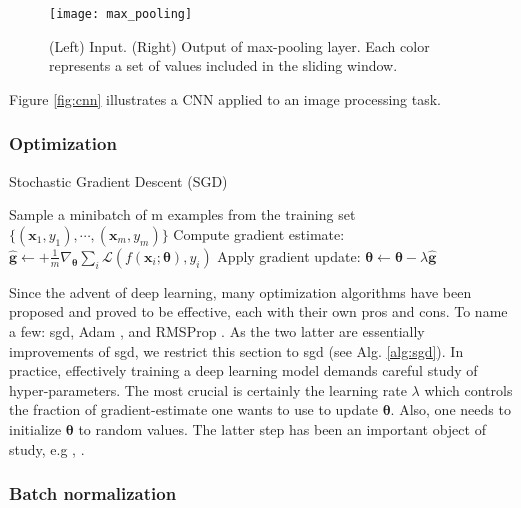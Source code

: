 \begin{figure}[!htpb]
  \centering
  \texttt{[image: max\_pooling]}
  \caption{(Left) Input. (Right) Output of max-pooling layer. Each color represents a set of values included in the sliding window.}
  \label{fig:max_pool}
\end{figure}
Figure \ref{fig:cnn} illustrates a CNN applied to an image processing task.

\subsubsection{Optimization}

\begin{algorithm}
  \label{alg:sgd}
 \caption{Stochastic Gradient Descent (SGD)}

 \begin{algorithmic}[1]
  \Repeat
    \State Sample a minibatch of m examples from the training set $\{(\bm{x}_{1},y_{1}), \cdots, (\bm{x}_{m},y_{m})\}$
    \State Compute gradient estimate: $\hat{\bm{g}} \leftarrow + \frac{1}{m} \nabla_{\bm{\theta}}\sum_{i}\mathcal{L}(f(\bm{x}_{i}; \bm{\theta}), y_{i})$
    \State Apply gradient update: $\bm{\theta} \leftarrow \bm{\theta} - \lambda \hat{\bm{g}}$
  \end{algorithmic}
\end{algorithm}

Since the advent of deep learning, many optimization algorithms have been proposed and proved to be effective, each with their own pros and cons.
To name a few: \gls{sgd}, Adam \cite{kingma14}, and RMSProp \cite{tieleman12}.
As the two latter are essentially improvements of \gls{sgd}, we restrict this section to \gls{sgd} (see Alg. \ref{alg:sgd}).
In practice, effectively training a deep learning model demands careful study of hyper-parameters.
The most crucial is certainly the learning rate $\lambda$ which controls the fraction of gradient-estimate one wants to use to update $\bm{\theta}$.
Also, one needs to initialize $\bm{\theta}$ to random values.
The latter step has been an important object of study, e.g \cite{he15}, \cite{glorot10}.



\subsubsection{Batch normalization}

